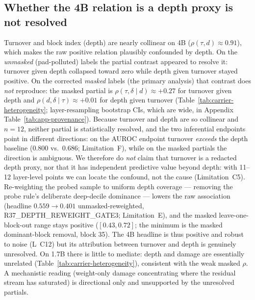 \documentclass{article}
\begin{document}
\subsection{Whether the 4B relation is a depth proxy is not resolved}
\label{sec:results-depth}
Turnover and block index (depth) are nearly collinear on 4B ($\rho(\tau,d)\approx0.91$),
which makes the raw positive relation plausibly confounded by depth. On the \emph{unmasked}
(pad-polluted) labels the partial contrast appeared to resolve it: turnover given depth
collapsed toward zero while depth given turnover stayed positive. On the corrected
\emph{masked} labels (the primary analysis) that contrast does \emph{not} reproduce: the masked
partial is $\rho(\tau,\delta\mid d)\approx+0.27$ for turnover given depth and
$\rho(d,\delta\mid\tau)\approx+0.01$ for depth given turnover
(Table~\ref{tab:carrier-heterogeneity}; layer-resampling bootstrap CIs, which are wide, in
Appendix Table~\ref{tab:app-provenance}). Because turnover and depth are so collinear and
$n{=}12$, neither partial is statistically resolved, and the two inferential endpoints point in
different directions: on the AUROC endpoint turnover \emph{exceeds} the depth baseline
($0.800$ vs.\ $0.686$; Limitation~F), while on the masked partials the direction is ambiguous.
We therefore do \emph{not} claim that turnover is a redacted depth proxy, nor that it has
independent predictive value beyond depth: with 11--12 layer-level points we can locate the
confound, not the cause (Limitation~C5). Re-weighting the probed sample to uniform depth
coverage --- removing the probe rule's deliberate deep-decile dominance --- lowers the raw
association (headline $0.559\to0.401$ unmasked-reweighted, R37\_DEPTH\_REWEIGHT\_GATE3;
Limitation~E), and the masked leave-one-block-out range stays positive
($[0.43,0.72]$; the minimum is the masked dominant-block removal, block 35). The 4B headline
is thus positive and robust to noise (L~C12) but its attribution between turnover and depth is
genuinely unresolved. On 1.7B there is little to mediate: depth and damage are essentially
unrelated (Table~\ref{tab:carrier-heterogeneity}), consistent with the weak masked $\rho$. A
mechanistic reading (weight-only damage concentrating where the residual stream has saturated)
is directional only and unsupported by the unresolved partials.
\end{document}
